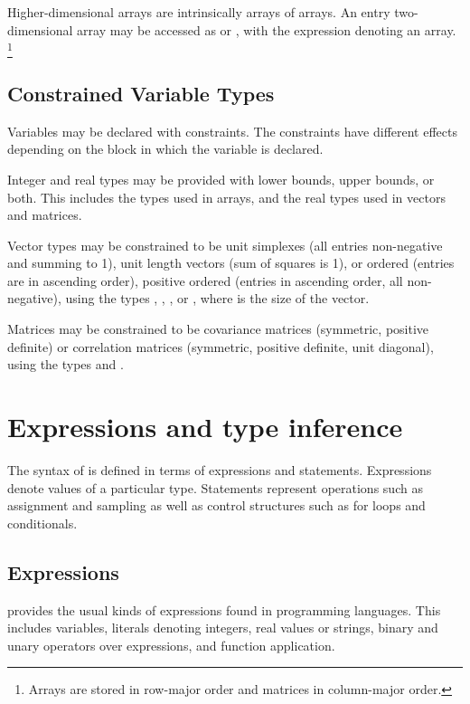\documentclass[article]{jss}
\begin{document}
Higher-dimensional arrays are intrinsically arrays of arrays.  An
entry two-dimensional array  may be accessed as 
or , with the expression  denoting an array.%
%
\footnote{ Arrays are stored in row-major order and matrices in
  column-major order.}

\subsection{Constrained Variable Types}

Variables may be declared with constraints.  The constraints have
different effects depending on the block in which the variable is
declared.

Integer and real types may be provided with lower bounds, upper
bounds, or both.  This includes the types used in arrays, and the real
types used in vectors and matrices.

Vector types may be constrained to be unit simplexes (all entries
non-negative and summing to 1), unit length vectors (sum of squares is 1), or
ordered (entries are in ascending order), positive ordered (entries in
ascending order, all non-negative), using the types ,
, , or
, where  is the size of the vector.

Matrices may be constrained to be covariance matrices (symmetric,
positive definite) or correlation matrices (symmetric, positive
definite, unit diagonal), using the types  and
.

\section{Expressions and type inference}

The syntax of  is defined in terms of expressions and
statements.  Expressions denote values of a particular type.  
Statements represent operations such as assignment and sampling as
well as control structures such as for loops and conditionals.

\subsection{Expressions}

 provides the usual kinds of expressions found in
programming languages.  This includes variables, literals denoting
integers, real values or strings, binary and unary operators over
expressions, and function application.  
\end{document}
